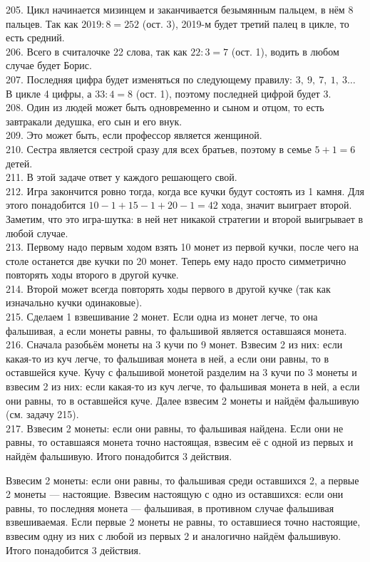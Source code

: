 205. Цикл начинается мизинцем и заканчивается безымянным пальцем, в нём 8 пальцев. Так как $2019:8=252$ (ост. 3), 2019-м будет третий палец в цикле, то есть средний.\\
206. Всего в считалочке 22 слова, так как $22:3=7$ (ост. 1), водить в любом случае будет Борис.\\
207. Последняя цифра будет изменяться по следующему правилу: $3,\ 9,\ 7,\ 1,\ 3\ldots$ В цикле 4 цифры, а $33:4=8$ (ост. 1), поэтому последней цифрой будет 3.\\
208. Один из людей может быть одновременно и сыном и отцом, то есть завтракали дедушка, его сын и его внук.\\
209. Это может быть, если профессор является женщиной.\\
210. Сестра является сестрой сразу для всех братьев, поэтому в семье $5+1=6$ детей.\\
211. В этой задаче ответ у каждого решающего свой.\\
212. Игра закончится ровно тогда, когда все кучки будут состоять из 1 камня. Для этого понадобится $10-1+15-1+20-1=42$ хода, значит выиграет второй. Заметим, что это игра-шутка: в ней нет никакой стратегии и второй выигрывает в любой случае.\\
213. Первому надо первым ходом взять 10 монет из первой кучки, после чего на столе останется две кучки по 20 монет. Теперь ему надо просто симметрично повторять ходы второго в другой кучке.\\
214. Второй может всегда повторять ходы первого в другой кучке (так как изначально кучки одинаковые).\\
215. Сделаем 1 взвешивание 2 монет. Если одна из монет легче, то она фальшивая, а если монеты равны, то фальшивой является оставшаяся монета.\\
216. Сначала разобьём монеты на 3 кучи по 9 монет. Взвесим 2 из них: если какая-то из куч легче, то фальшивая монета в ней, а если они равны, то в оставшейся куче. Кучу с фальшивой монетой разделим на 3 кучи по 3 монеты и взвесим 2 из них:  если какая-то из куч легче, то фальшивая монета в ней, а если они равны, то в оставшейся куче. Далее взвесим 2 монеты и найдём фальшивую (см. задачу 215).\\
217. Взвесим 2 монеты: если они равны, то фальшивая найдена. Если они не равны, то оставшаяся монета точно настоящая, взвесим её с одной из первых и найдём фальшивую. Итого понадобится 3 действия.

Взвесим 2 монеты: если они равны, то фальшивая среди оставшихся 2, а первые 2 монеты --- настоящие. Взвесим настоящую с одно из оставшихся: если они равны, то последняя монета --- фальшивая, в противном случае фальшивая взвешиваемая. Если первые 2 монеты не равны, то оставшиеся точно настоящие, взвесим одну из них с любой из первых 2 и аналогично найдём фальшивую. Итого понадобится 3 действия.

